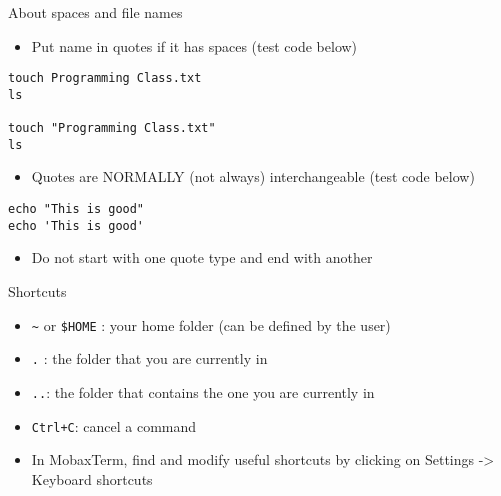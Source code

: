 \documentclass[
  ignorenonframetext,
]{beamer}
\providecommand{\tightlist}{%
  \setlength{\itemsep}{0pt}\setlength{\parskip}{0pt}}
\begin{document}
\begin{frame}[fragile]{About spaces and file names}
\protect\hypertarget{slide2}{}
\begin{itemize}[<+->]
\tightlist
\item
  Put name in quotes if it has spaces (test code below)
\end{itemize}

\begin{block}{}
\protect\hypertarget{section-2}{}
\begin{verbatim}
touch Programming Class.txt
ls

touch "Programming Class.txt"
ls
\end{verbatim}
\end{block}

\begin{block}{}
\protect\hypertarget{section-3}{}
\begin{itemize}[<+->]
\tightlist
\item
  Quotes are NORMALLY (not always) interchangeable (test code below)
\end{itemize}
\end{block}

\begin{block}{}
\protect\hypertarget{section-4}{}
\begin{verbatim}
echo "This is good"
echo 'This is good'
\end{verbatim}
\end{block}

\begin{block}{}
\protect\hypertarget{section-5}{}
\begin{itemize}[<+->]
\tightlist
\item
  Do not start with one quote type and end with another
\end{itemize}
\end{block}
\end{frame}

\begin{frame}[fragile]{Shortcuts}
\protect\hypertarget{slide3}{}
\begin{itemize}[<+->]
\tightlist
\item
  {\texttt{\textasciitilde{}} }or {\texttt{\$HOME} }: your home folder
  (can be defined by the user)
\item
  {\texttt{.}} : the folder that you are currently in
\item
  {\texttt{..}}: the folder that contains the one you are currently in
\item
  {\texttt{Ctrl+C}}: cancel a command
\item
  In MobaxTerm, find and modify useful shortcuts by clicking on Settings
  -\textgreater{} Keyboard shortcuts
\end{itemize}
\end{frame}
\end{document}
